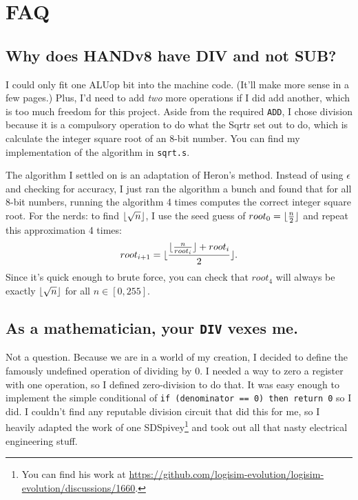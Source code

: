 \documentclass[12pt, oneside]{memoir}
\DeclarePairedDelimiter{\floor}{\lfloor}{\rfloor}
\newcommand{\instruction}[1]{{\color{instruction}\texttt{#1}}}
\begin{document}
\section{FAQ}
\subsection{Why does HANDv8 have DIV and not SUB?}
I could only fit one ALUop bit into the machine code. (It'll make more sense in a few pages.) Plus, I'd need to add \textit{two} more operations if I did add another, which is too much freedom for this project. Aside from the required \instruction{ADD}, I chose division because it is a compulsory operation to do what the Sqrtr set out to do, which is calculate the integer square root of an 8-bit number. You can find my implementation of the algorithm in \texttt{sqrt.s}.

The algorithm I settled on is an adaptation of Heron's method. Instead of using $\epsilon$ and checking for accuracy, I just ran the algorithm a bunch and found that for all 8-bit numbers, running the algorithm 4 times computes the correct integer square root. For the nerds: to find $\floor{\sqrt{n}}$, I use the seed guess of $root_0 = \floor{\frac{n}{2}}$ and repeat this approximation 4 times:
\begin{equation*}
    root_{i+1} = \floor{\frac{\floor{\frac{n}{root_{i}}} + root_{i}}{2}}.
\end{equation*}
Since it's quick enough to brute force, you can check that $root_4$ will always be exactly $\floor{\sqrt{n}}$ for all $n \in [0,255]$.

\subsection{As a mathematician, your \instruction{DIV} vexes me.}
Not a question. Because we are in a world of my creation, I decided to define the famously undefined operation of dividing by 0. I needed a way to zero a register with one operation, so I defined zero-division to do that. It was easy enough to implement the simple conditional of \texttt{if (denominator == 0) then return 0} so I did. I couldn't find any reputable division circuit that did this for me, so I heavily adapted the work of one SDSpivey\footnote{You can find his work at \href{https://github.com/logisim-evolution/logisim-evolution/discussions/1660}{https://github.com/logisim-evolution/logisim-evolution/discussions/1660}.} 
and took out all that nasty electrical engineering stuff.
\end{document}
